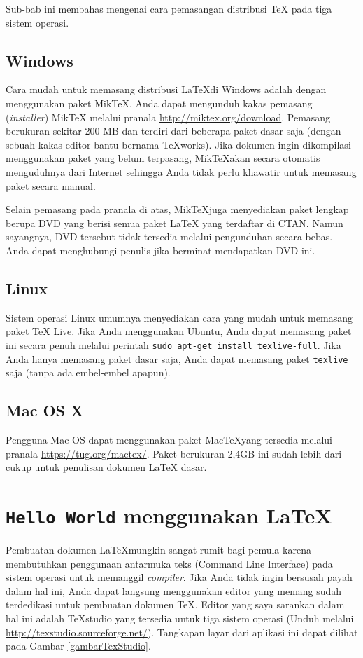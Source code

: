 \documentclass{ta-scientics-matematika-its}
\begin{document}
        Sub-bab ini membahas mengenai cara pemasangan distribusi \TeX{} pada tiga sistem operasi. 

        \subsection{Windows}
        Cara mudah untuk memasang distribusi \LaTeX di Windows adalah dengan menggunakan paket Mik\TeX{}. Anda dapat mengunduh kakas pemasang (\emph{installer}) Mik\TeX{} melalui pranala \url{http://miktex.org/download}.  Pemasang berukuran sekitar 200 MB dan terdiri dari beberapa paket dasar saja (dengan sebuah kakas editor bantu bernama \TeX{}works). Jika dokumen ingin dikompilasi menggunakan paket yang belum terpasang, Mik\TeX akan secara otomatis menguduhnya dari Internet sehingga Anda tidak perlu khawatir untuk memasang paket secara manual.


        Selain pemasang pada pranala di atas, Mik\TeX juga menyediakan paket lengkap berupa DVD yang berisi semua paket LaTeX yang terdaftar di CTAN. Namun sayangnya, DVD tersebut tidak tersedia melalui pengunduhan secara bebas. Anda dapat menghubungi penulis jika berminat mendapatkan DVD ini.


        \subsection{Linux}
        
        Sistem operasi Linux umumnya menyediakan cara yang mudah untuk memasang paket \TeX{} Live. Jika Anda menggunakan Ubuntu, Anda dapat memasang paket ini secara penuh melalui perintah \texttt{sudo apt-get install texlive-full}. Jika Anda hanya memasang paket dasar saja, Anda dapat memasang paket \texttt{texlive} saja (tanpa ada embel-embel apapun).

        \subsection{Mac OS X}
        Pengguna Mac OS dapat menggunakan paket Mac\TeX yang tersedia melalui pranala \url{https://tug.org/mactex/}. Paket berukuran 2,4GB ini sudah lebih dari cukup untuk penulisan dokumen La\TeX{} dasar.


        \section{\texttt{Hello World} menggunakan \LaTeX{}}
        Pembuatan dokumen La\TeX mungkin sangat rumit bagi pemula karena membutuhkan penggunaan antarmuka teks (Command Line Interface) pada sistem operasi untuk memanggil \emph{compiler}. Jika Anda tidak ingin bersusah payah dalam hal ini, Anda dapat langsung menggunakan editor yang memang sudah terdedikasi untuk pembuatan dokumen \TeX{}. Editor yang saya sarankan dalam hal ini adalah \TeX{}studio yang tersedia untuk tiga sistem operasi (Unduh melalui \url{http://texstudio.sourceforge.net/}). Tangkapan layar dari aplikasi ini dapat dilihat pada Gambar \ref{gambarTexStudio}.
\end{document}
